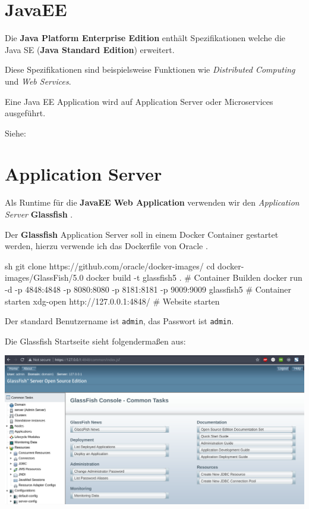 
\section{JavaEE}

Die \textbf{Java Platform Enterprise Edition} enthält Spezifikationen welche die Java SE (\textbf{Java Standard Edition}) erweitert.

Diese Spezifikationen sind beispielsweise Funktionen wie \textit{Distributed Computing} und \textit{Web Services}.

Eine Java EE Application wird auf Application Server oder Microservices ausgeführt.

Siehe: \cite{wiki:javaee}

\clearpage

\section{Application Server}

Als Runtime für die \textbf{JavaEE Web Application} verwenden wir den \textit{Application Server} \textbf{Glassfish} \cite{github:glassfish}.

Der \textbf{Glassfish} Application Server soll in einem Docker Container gestartet werden, hierzu verwende ich das Dockerfile von Oracle \cite{github:oracle-docker-images}.

\begin{code}{sh}
    git clone https://github.com/oracle/docker-images/
    cd docker-images/GlassFish/5.0
    docker build -t glassfish5 .  # Container Builden
    docker run -d -p 4848:4848 -p 8080:8080 -p 8181:8181 -p 9009:9009 glassfish5  # Container starten
    xdg-open http://127.0.0.1:4848/  # Website starten
\end{code}

\clearpage

Der standard Benutzername ist \texttt{admin}, das Passwort ist \texttt{admin}.

Die Glassfish Startseite sieht folgendermaßen aus:

\includegraphics[width=\textwidth]{images/glassfish-home}


